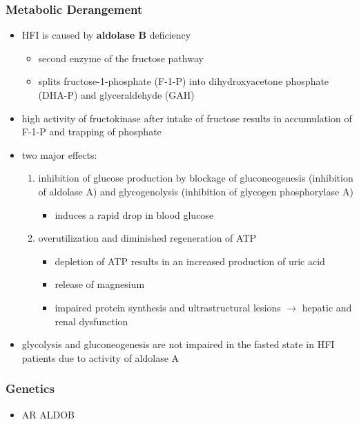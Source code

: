 \documentclass[12pt]{scrartcl}
\begin{document}
\subsubsection{Metabolic Derangement}
\label{sec:org832c867}
\begin{itemize}
\item HFI is caused by \textbf{aldolase B} deficiency
\begin{itemize}
\item second enzyme of the fructose pathway
\item splits fructose-1-phosphate (F-1-P) into dihydroxyacetone phosphate (DHA-P) and glyceraldehyde (GAH)
\end{itemize}
\item high activity of fructokinase after intake of fructose results in
accumulation of F-1-P and trapping of phosphate
\item two major effects:
\begin{enumerate}
\item inhibition of glucose production by blockage of gluconeogenesis
(inhibition of aldolase A) and glycogenolysis (inhibition of glycogen phosphorylase A)
\begin{itemize}
\item induces a rapid drop in blood glucose
\end{itemize}
\item overutilization and diminished regeneration of ATP
\begin{itemize}
\item depletion of ATP results in an increased production of uric acid
\item release of magnesium
\item impaired protein synthesis and ultrastructural lesions \(\to\)
hepatic and renal dysfunction
\end{itemize}
\end{enumerate}
\item glycolysis and gluconeogenesis are not impaired in the fasted state
in HFI patients due to activity of aldolase A
\end{itemize}

\subsubsection{Genetics}
\label{sec:org3591f6f}
\begin{itemize}
\item AR ALDOB
\end{itemize}
\end{document}
